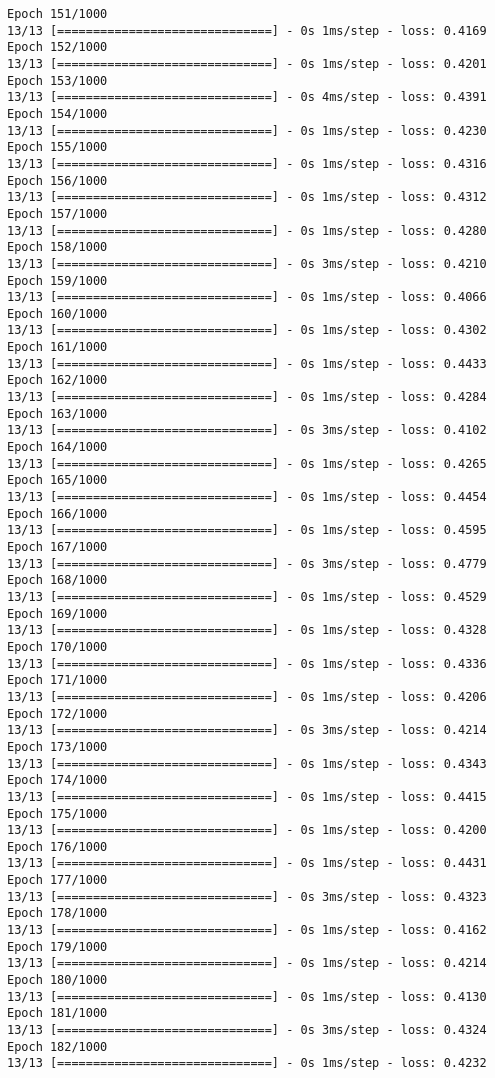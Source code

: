 \documentclass[11pt]{article}
\begin{document}
\begin{Verbatim}[commandchars=\\\{\}]
Epoch 151/1000
13/13 [==============================] - 0s 1ms/step - loss: 0.4169
Epoch 152/1000
13/13 [==============================] - 0s 1ms/step - loss: 0.4201
Epoch 153/1000
13/13 [==============================] - 0s 4ms/step - loss: 0.4391
Epoch 154/1000
13/13 [==============================] - 0s 1ms/step - loss: 0.4230
Epoch 155/1000
13/13 [==============================] - 0s 1ms/step - loss: 0.4316
Epoch 156/1000
13/13 [==============================] - 0s 1ms/step - loss: 0.4312
Epoch 157/1000
13/13 [==============================] - 0s 1ms/step - loss: 0.4280
Epoch 158/1000
13/13 [==============================] - 0s 3ms/step - loss: 0.4210
Epoch 159/1000
13/13 [==============================] - 0s 1ms/step - loss: 0.4066
Epoch 160/1000
13/13 [==============================] - 0s 1ms/step - loss: 0.4302
Epoch 161/1000
13/13 [==============================] - 0s 1ms/step - loss: 0.4433
Epoch 162/1000
13/13 [==============================] - 0s 1ms/step - loss: 0.4284
Epoch 163/1000
13/13 [==============================] - 0s 3ms/step - loss: 0.4102
Epoch 164/1000
13/13 [==============================] - 0s 1ms/step - loss: 0.4265
Epoch 165/1000
13/13 [==============================] - 0s 1ms/step - loss: 0.4454
Epoch 166/1000
13/13 [==============================] - 0s 1ms/step - loss: 0.4595
Epoch 167/1000
13/13 [==============================] - 0s 3ms/step - loss: 0.4779
Epoch 168/1000
13/13 [==============================] - 0s 1ms/step - loss: 0.4529
Epoch 169/1000
13/13 [==============================] - 0s 1ms/step - loss: 0.4328
Epoch 170/1000
13/13 [==============================] - 0s 1ms/step - loss: 0.4336
Epoch 171/1000
13/13 [==============================] - 0s 1ms/step - loss: 0.4206
Epoch 172/1000
13/13 [==============================] - 0s 3ms/step - loss: 0.4214
Epoch 173/1000
13/13 [==============================] - 0s 1ms/step - loss: 0.4343
Epoch 174/1000
13/13 [==============================] - 0s 1ms/step - loss: 0.4415
Epoch 175/1000
13/13 [==============================] - 0s 1ms/step - loss: 0.4200
Epoch 176/1000
13/13 [==============================] - 0s 1ms/step - loss: 0.4431
Epoch 177/1000
13/13 [==============================] - 0s 3ms/step - loss: 0.4323
Epoch 178/1000
13/13 [==============================] - 0s 1ms/step - loss: 0.4162
Epoch 179/1000
13/13 [==============================] - 0s 1ms/step - loss: 0.4214
Epoch 180/1000
13/13 [==============================] - 0s 1ms/step - loss: 0.4130
Epoch 181/1000
13/13 [==============================] - 0s 3ms/step - loss: 0.4324
Epoch 182/1000
13/13 [==============================] - 0s 1ms/step - loss: 0.4232

\end{Verbatim}
\end{document}
